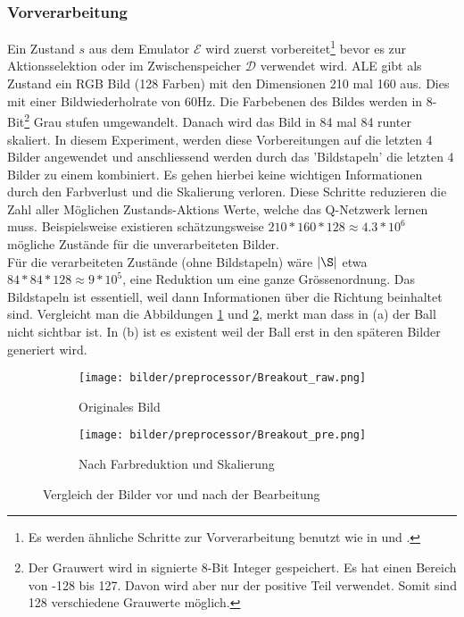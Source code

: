 \documentclass[a4paper,titlepage]{article}
\numberwithin{equation}{section} %
\begin{document}
{\subsubsection{Vorverarbeitung}
Ein Zustand $s$ aus dem Emulator $\mathcal{E}$ wird zuerst vorbereitet\footnote{Es werden ähnliche Schritte zur Vorverarbeitung benutzt wie in \cite{Bellemare_2013} und \cite{vanhasseltDeepReinforcementLearning2015}.} bevor es zur Aktionsselektion oder im Zwischenspeicher $\mathcal{D}$ verwendet wird. ALE gibt als Zustand ein RGB Bild (128 Farben) mit den Dimensionen 210 mal 160 aus. Dies mit einer Bildwiederholrate von 60Hz. Die Farbebenen des Bildes werden in 8-Bit\footnote{Der Grauwert wird in signierte 8-Bit Integer gespeichert. Es hat einen Bereich von -128 bis 127. Davon wird aber nur der positive Teil verwendet. Somit sind 128 verschiedene Grauwerte möglich.} Grau stufen umgewandelt. Danach wird das Bild in 84 mal 84 runter skaliert. In diesem Experiment, werden diese Vorbereitungen auf die letzten 4 Bilder angewendet und anschliessend werden durch das 'Bildstapeln' die letzten 4 Bilder zu einem kombiniert. Es gehen hierbei keine wichtigen Informationen durch den Farbverlust und die Skalierung verloren. Diese Schritte reduzieren die Zahl aller Möglichen Zustands-Aktions Werte, welche das Q-Netzwerk lernen muss. Beispielsweise existieren schätzungsweise $210*160*128 \approx 4.3*10^6$ mögliche Zustände für die unverarbeiteten Bilder.\\ Für die verarbeiteten Zustände (ohne Bildstapeln) wäre $|\S|$ etwa $84*84*128 \approx 9*10^5$, eine Reduktion um eine ganze Grössenordnung. Das Bildstapeln ist essentiell, weil dann Informationen über die Richtung beinhaltet sind. Vergleicht man die Abbildungen \ref{fig:Breakout_raw} und \ref{fig:Breakout_processed}, merkt man dass in (a) der Ball nicht sichtbar ist. In (b) ist es existent weil der Ball erst in den späteren Bilder generiert wird.



\begin{figure}
	\centering
	\begin{subfigure}{0.5\textwidth}
		\centering
		\texttt{[image: bilder/preprocessor/Breakout\_raw.png]}
		\caption{Originales Bild}
		\label{fig:Breakout_raw}
	\end{subfigure}%
	\begin{subfigure}{0.5\textwidth}
		\centering
		\texttt{[image: bilder/preprocessor/Breakout\_pre.png]}
		\caption{Nach Farbreduktion und Skalierung}
		\label{fig:Breakout_processed}
	\end{subfigure}
\caption{Vergleich der Bilder vor und nach der Bearbeitung}
\label{figs:vergleich}
\end{figure}

}
\end{document}
